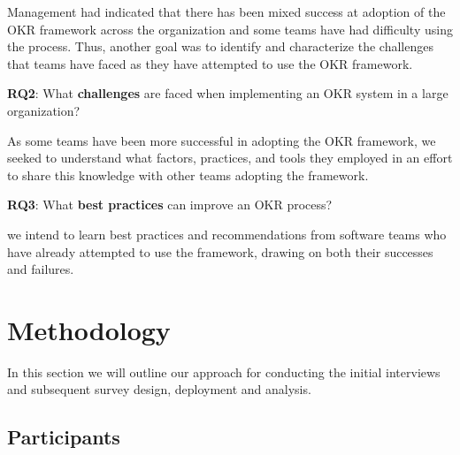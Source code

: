 \documentclass[sigconf, nonacm]{acmart}
\begin{document}
Management had indicated that there has been mixed success at adoption of the OKR framework across the organization and some teams have had difficulty using the process.
Thus, another goal was to identify and characterize the challenges that teams have faced as they have attempted to use the OKR framework.

\vspace{4pt}
\noindent{}\textbf{RQ2}: What \textbf{challenges} are faced when implementing an OKR system in a large organization?
\vspace{4pt}

As some teams have been more successful in adopting the OKR framework, we seeked to understand what factors, practices, and tools they employed in an effort to share this knowledge with other teams adopting the framework.  

\vspace{4pt}
\noindent{}\textbf{RQ3}: What \textbf{best practices} can improve an OKR process?
\vspace{4pt}

 we intend to learn best practices and recommendations from software teams who have already attempted to use the framework, drawing on both their successes and failures. 

\section{Methodology}
\label{sec:methodology}


In this section we will outline our approach for conducting the initial interviews and subsequent survey design, deployment and analysis. 

\subsection{Participants}
\end{document}
